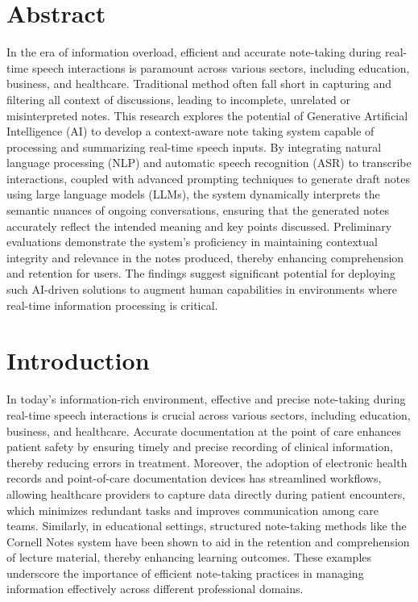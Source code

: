 \documentclass[12pt,a4paper]{article}
\begin{document}
\tableofcontents
\newpage


\section*{Abstract}
In the era of information overload, efficient and accurate note-taking during
real-time speech interactions is paramount across various sectors, including
education, business, and healthcare. Traditional method often fall short in
capturing and filtering all context of discussions, leading to incomplete,
unrelated or misinterpreted notes. This research explores the potential of
Generative Artificial Intelligence (AI) to develop a context-aware note taking
system capable of processing and summarizing real-time speech inputs. By
integrating natural language processing (NLP) and automatic speech recognition
(ASR) to transcribe interactions, coupled with advanced prompting techniques to
generate draft notes using large language models (LLMs), the system dynamically
interprets the semantic nuances of ongoing conversations, ensuring that the
generated notes accurately reflect the intended meaning and key points
discussed. Preliminary evaluations demonstrate the system's proficiency in
maintaining contextual integrity and relevance in the notes produced, thereby
enhancing comprehension and retention for users. The findings suggest
significant potential for deploying such AI-driven solutions to augment human
capabilities in environments where real-time information processing is critical.

\newpage
\section{Introduction}
In today's information-rich environment, effective and precise note-taking
during real-time speech interactions is crucial across various sectors,
including education, business, and healthcare. Accurate documentation at the
point of care enhances patient safety by ensuring timely and precise recording
of clinical information, thereby reducing errors in treatment. %
Moreover, the adoption of electronic health records and point-of-care
documentation devices has streamlined workflows, allowing healthcare providers
to capture data directly during patient encounters, which minimizes redundant
tasks and improves communication among care teams. %
Similarly, in educational settings, structured note-taking methods like the
Cornell Notes system have been shown to aid in the retention and comprehension
of lecture material, thereby enhancing learning outcomes\cite{boyle2014note}.
These examples underscore the importance of efficient note-taking practices in
managing information effectively across different professional domains.
\end{document}
